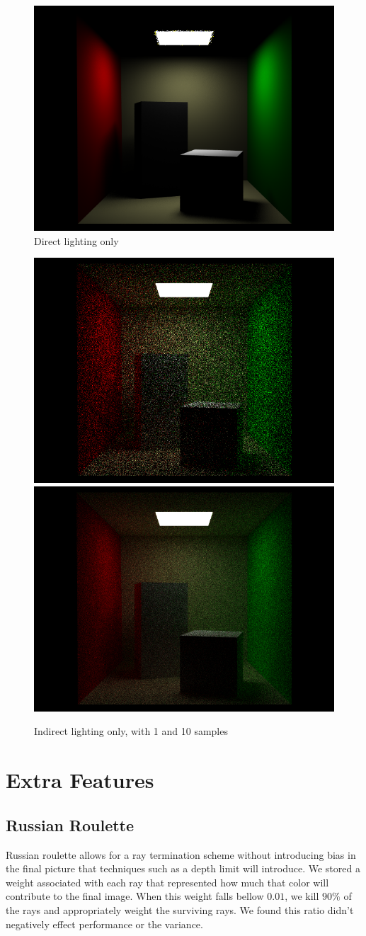 \documentclass[11pt]{article}
\begin{document}
\begin{figure}
  \begin{center}
    \includegraphics[width=.5\linewidth]{figs/direct_only_cornell}
  \end{center}
  \caption{Direct lighting only}
\end{figure}

\begin{figure}
  \begin{center}
  \includegraphics[width=.4\linewidth]{figs/indirect_only_1sample}
  \includegraphics[width=.4\linewidth]{figs/indirect_only_10sample}
  \end{center}
  \caption{Indirect lighting only, with 1 and 10 samples}
\end{figure}

\section{Extra Features}

\subsection{Russian Roulette}
Russian roulette allows for a ray termination scheme without introducing bias in the final picture that techniques such as a depth limit will introduce. We stored a weight associated with each ray that represented how much that color will contribute to the final image. When this weight falls bellow $0.01$, we kill $90\%$ of the rays and appropriately weight the surviving rays. We found this ratio didn't negatively effect performance or the variance.
\end{document}
